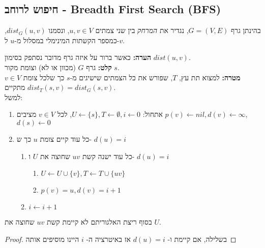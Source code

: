 \subsection*{%
חיפוש לרוחב - 
\textenglish{Breadth First Search (BFS)}
}
\begin{definition}[מרחק]
בהינתן גרף 
$G = (V, E)$,
נגדיר את 
\emph{המרחק}
בין שני צמתים 
$u,v \in V$,
ונסמנו 
$dist_G(u,v)$,
כמספר הקשתות המינימלי במסלול מ-$u$ ל-$v$.
\end{definition}
\noindent
\textbf{הערה:}
כאשר ברור על איזה גרף מדובר נסתפק בסימון 
$dist(u,v)$.
\vspace{5mm}
\\
\textbf{קלט:}
גרף $G$ (מכוון או לא) וצומת מקור $s$.
\\
\textbf{מטרה:}
למצוא תת עץ, $T$, שפורש את כל הצמתים שישיגים מ-$s$ כך שלכל צומת 
$v \in V$
מתקיים
$dist_T(s, v) = dist_G(s, v)$.
\\
למשל:
\begin{center}
\end{center}

\begin{enumerate}
\item
אתחול:
$U \leftarrow \{s\}, T \leftarrow \emptyset, i \leftarrow 0$, 
לכל 
$v \in V$
מציבים
$p(v) \leftarrow nil, d(v) \leftarrow \infty$,
$d(s) \leftarrow 0$
\item 
כל עוד קיים צומת $u$ כך ש-%
$d(u) = i$
\label{item:bfs:while}
\begin{enumerate}
	\item 
	כל עוד ישנה קשת 
	$uv$
	שחוצה את $U$ ו-%
	$d(u) = i$
		\begin{enumerate}
		\item
		$U \leftarrow U \cup \{v\}, T \leftarrow T \cup \{uv\}$
		\item
		$p(v) = u, d(v) = i + 1$
		\end{enumerate}
	\item
	$i \leftarrow i+1$
	\end{enumerate}
\end{enumerate}
\begin{claim}
בסוף ריצת האלגוריתם לא קיימת קשת 
$uv$
שחוצה את $U$.
\end{claim}
\begin{proof}
בשלילה, אם קיימת ו-%
$d(u) = i$
אז באיטרציה ה-%
$i$
היינו מוסיפים אותה
\end{proof}

